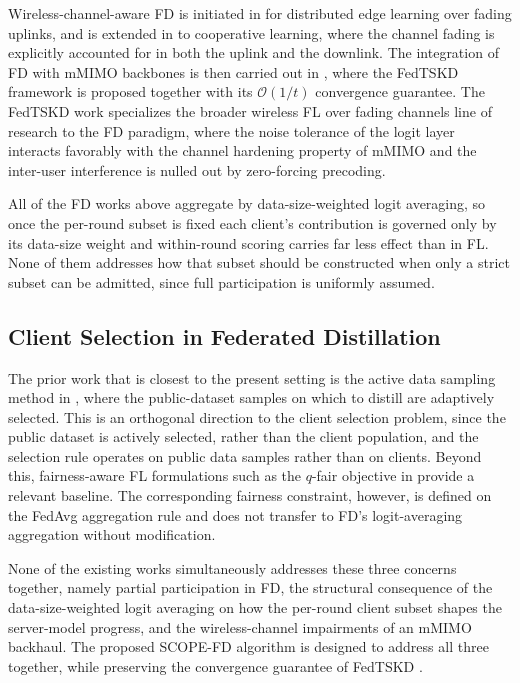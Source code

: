 \documentclass[journal]{IEEEtran}
\begin{document}
Wireless-channel-aware FD is initiated in \cite{ahn2019wireless} for distributed edge learning over fading uplinks, and is extended in \cite{ahn2020cooperative} to cooperative learning, where the channel fading is explicitly accounted for in both the uplink and the downlink. The integration of FD with mMIMO backbones is then carried out in \cite{mu2024fedtskd}, where the FedTSKD framework is proposed together with its $\mathcal{O}(1/t)$ convergence guarantee. The FedTSKD work specializes the broader wireless FL over fading channels line of research \cite{amiri2020federated, amiri2020machine, vu2020cell, amiri2021convergence} to the FD paradigm, where the noise tolerance of the logit layer interacts favorably with the channel hardening property of mMIMO and the inter-user interference is nulled out by zero-forcing precoding.

All of the FD works above aggregate by data-size-weighted logit averaging, so once the per-round subset is fixed each client's contribution is governed only by its data-size weight and within-round scoring carries far less effect than in FL. None of them addresses how that subset should be constructed when only a strict subset can be admitted, since full participation is uniformly assumed.

\subsection{Client Selection in Federated Distillation}
\label{ssec:rw-fd-selection}

The prior work that is closest to the present setting is the active data sampling method in \cite{liu2022active}, where the public-dataset samples on which to distill are adaptively selected. This is an orthogonal direction to the client selection problem, since the public dataset is actively selected, rather than the client population, and the selection rule operates on public data samples rather than on clients. Beyond this, fairness-aware FL formulations such as the $q$-fair objective in \cite{li2020qffl} provide a relevant baseline. The corresponding fairness constraint, however, is defined on the FedAvg aggregation rule and does not transfer to FD's logit-averaging aggregation without modification.

None of the existing works simultaneously addresses these three concerns together, namely partial participation in FD, the structural consequence of the data-size-weighted logit averaging on how the per-round client subset shapes the server-model progress, and the wireless-channel impairments of an mMIMO backhaul. The proposed SCOPE-FD algorithm is designed to address all three together, while preserving the convergence guarantee of FedTSKD \cite{mu2024fedtskd}.
\end{document}
